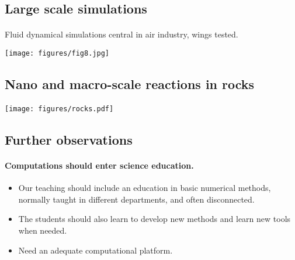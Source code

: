 \documentclass[%
twoside,                 %
final,                   %
10pt]{article}
\begin{document}




\subsection{Large scale simulations}

\paragraph{}
Fluid dynamical simulations central in air industry, wings tested.


\centerline{\texttt{[image: figures/fig8.jpg]}}







\subsection{Nano and macro-scale reactions in rocks}

\paragraph{}


\centerline{\texttt{[image: figures/rocks.pdf]}}








\subsection{Further observations}

\paragraph{Computations should enter science education.}

\begin{itemize}
\item Our teaching should include  an education in basic numerical methods, normally taught in different departments, and often disconnected. 

\item The students should also learn to develop new methods and learn new tools when needed.

\item Need an adequate computational platform.
\end{itemize}
\end{document}
